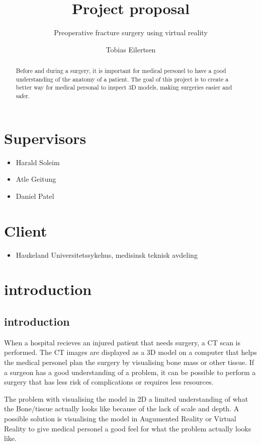\documentclass[11pt]{scrartcl}
\begin{document}
\title{Project proposal}
\subtitle{Preoperative fracture surgery using virtual reality}

\author{Tobias Eilertsen}
\maketitle


\section*{Supervisors}
\begin{itemize}
  \item Harald Soleim
  \item Atle Geitung
  \item Daniel Patel
\end{itemize}
\section*{Client}
\begin{itemize}
  \item Haukeland Universitetssykehus, medisinsk teknisk avdeling
\end{itemize}

\begin{abstract}
  Before and during a surgery, it is important for medical personel to have a good understanding of the anatomy of a patient.
  The goal of this project is to create a better way for medical personal to inspect 3D models, making surgeries easier and safer.
\end{abstract}

\newpage
\section{introduction}


\subsection{introduction}

When a hospital recieves an injured patient that needs surgery, a CT scan is performed. The CT images are displayed as a 3D model on a computer that helps the medical personel plan the surgery by visualising bone mass or other tissue. If a surgeon has a good understanding of a problem, it can be possible to perform a surgery that has less risk of complications or requires less resources.


The problem with visualising the model in 2D a limited understanding of what the Bone/tissue actually looks like because of the lack of scale and depth. A possible solution is visualising the model in Augumented Reality or Virtual Reality to give medical personel a good feel for what the problem actually looks like. 
\end{document}
